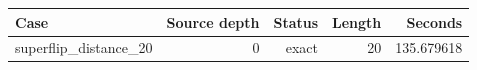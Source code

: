 {\small
\begin{tabular}{lrrrr}
\hline
Case & Source depth & Status & Length & Seconds \\
\hline
superflip\_distance\_20 & 0 & exact & 20 & 135.679618 \\
\hline
\end{tabular}
}
